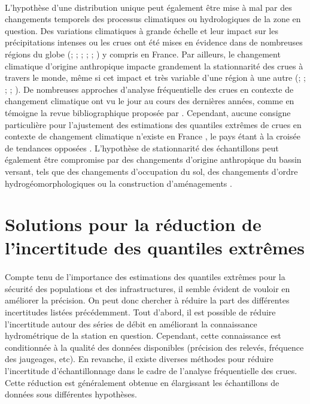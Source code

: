 \documentclass[11pt]{article}
\begin{document}
	\paragraph{} L'hypothèse d'une distribution unique peut également être mise à mal par des changements temporels des processus climatiques ou hydrologiques de la zone en question. Des variations climatiques à grande échelle et leur impact sur les précipitations intenses ou les crues ont été mises en évidence dans de nombreuses régions du globe (\citet{sun_general_2014}; \citet{hodgkins_climate-driven_2017}; \citet{gudmundsson_observed_2019}; \citet{lun_detecting_2020}; \citet{bloschl_current_2020}; \citet{tramblay_changes_2023}) y compris en France. Par ailleurs, le changement climatique d'origine anthropique impacte grandement la stationnarité des crues à travers le monde, même si cet impact et très variable d'une région à une autre (\citet{milly_stationarity_2008}; \citet{hall_understanding_2014}; \citet{bloschl_changing_2019}; \citet{giuntoli_floods_2019}; \citet{portner_climate_2022}). De nombreuses approches d'analyse fréquentielle des crues en contexte de changement climatique ont vu le jour au cours des dernières années, comme en témoigne la revue bibliographique proposée par \citet{salas_techniques_2018}. Cependant, aucune consigne particulière pour l'ajustement des estimations des quantiles extrêmes de crues en contexte de changement climatique n'existe en France \citep{madsen_review_2014}, le pays étant à la croisée de tendances opposées \citep{bloschl_changing_2019}. L'hypothèse de stationnarité des échantillons peut également être compromise par des changements d'origine anthropique du bassin versant, tels que des changements d'occupation du sol, des changements d'ordre hydrogéomorphologiques ou la construction d'aménagements \citep{hall_understanding_2014}.
	

	\section{Solutions pour la réduction de l'incertitude des quantiles extrêmes}
	
	\paragraph{} Compte tenu de l'importance des estimations des quantiles extrêmes pour la sécurité des populations et des infrastructures, il semble évident de vouloir en améliorer la précision. On peut donc chercher à réduire la part des différentes incertitudes listées précédemment. Tout d'abord, il est possible de réduire l'incertitude autour des séries de débit en améliorant la connaissance hydrométrique de la station en question. Cependant, cette connaissance est conditionnée à la qualité des données disponibles (précision des relevés, fréquence des jaugeages, etc). En revanche, il existe diverses méthodes pour réduire l'incertitude d'échantillonnage dans le cadre de l'analyse fréquentielle des crues. Cette réduction est généralement obtenue en élargissant les échantillons de données sous différentes hypothèses.
	 
\end{document}
